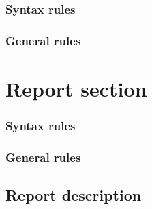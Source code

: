 \subsubsection{Syntax rules}

\subsubsection{General rules}

\section{Report section}
\begin{syntax}
\end{syntax}

\subsubsection{Syntax rules}

\subsubsection{General rules}

\subsection{Report description}

